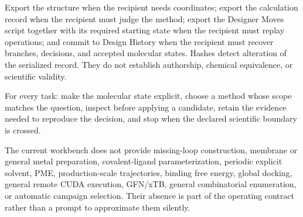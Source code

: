 Export the structure when the recipient needs coordinates; export the calculation record when the recipient must judge the method; export the Designer Moves script together with its required starting state when the recipient must replay operations; and commit to Design History when the recipient must recover branches, decisions, and accepted molecular states. Hashes detect alteration of the serialized record. They do not establish authorship, chemical equivalence, or scientific validity.

For every task: make the molecular state explicit, choose a method whose scope matches the question, inspect before applying a candidate, retain the evidence needed to reproduce the decision, and stop when the declared scientific boundary is crossed.


The current workbench does not provide missing-loop construction, membrane or general metal preparation, covalent-ligand parameterization, periodic explicit solvent, PME, production-scale trajectories, binding free energy, global docking, general remote CUDA execution, GFN/xTB, general combinatorial enumeration, or automatic campaign selection. Their absence is part of the operating contract rather than a prompt to approximate them silently.
\endgroup
